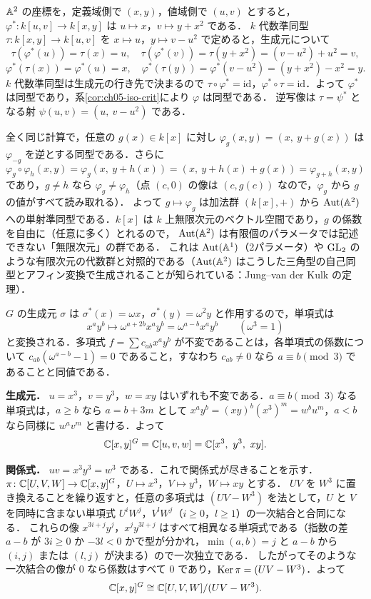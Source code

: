 $\mathbb{A}^2$ の座標を，定義域側で $(x,y)$，値域側で $(u,v)$ とすると，$\varphi^*\colon k[u,v]\to k[x,y]$ は $u\mapsto x$，$v\mapsto y+x^2$ である．
$k$ 代数準同型 $\tau\colon k[x,y]\to k[u,v]$ を $x\mapsto u$，$y\mapsto v-u^2$ で定めると，生成元について
\[
  \tau(\varphi^*(u))=\tau(x)=u,\quad \tau(\varphi^*(v))=\tau(y+x^2)=(v-u^2)+u^2=v,
\]
\[
  \varphi^*(\tau(x))=\varphi^*(u)=x,\quad \varphi^*(\tau(y))=\varphi^*(v-u^2)=(y+x^2)-x^2=y.
\]
$k$ 代数準同型は生成元の行き先で決まるので $\tau\circ\varphi^*=\mathrm{id}$，$\varphi^*\circ\tau=\mathrm{id}$．よって $\varphi^*$ は同型であり，系\ref{cor:ch05-iso-crit}により $\varphi$ は同型である．
逆写像は $\tau=\psi^*$ となる射 $\psi(u,v)=(u,\ v-u^2)$ である．

全く同じ計算で，任意の $g(x)\in k[x]$ に対し $\varphi_g(x,y)=(x,\ y+g(x))$ は $\varphi_{-g}$ を逆とする同型である．さらに
\[
  \varphi_g\circ\varphi_h(x,y)=\varphi_g(x,\ y+h(x))=(x,\ y+h(x)+g(x))=\varphi_{g+h}(x,y)
\]
であり，$g\ne h$ なら $\varphi_g\ne\varphi_h$（点 $(c,0)$ の像は $(c,g(c))$ なので，$\varphi_g$ から $g$ の値がすべて読み取れる）．
よって $g\mapsto\varphi_g$ は加法群 $(k[x],+)$ から $\operatorname{Aut}(\mathbb{A}^2)$ への単射準同型である．$k[x]$ は $k$ 上無限次元のベクトル空間であり，$g$ の係数を自由に（任意に多く）とれるので，
$\operatorname{Aut}(\mathbb{A}^2)$ は有限個のパラメータでは記述できない「無限次元」の群である．
これは $\operatorname{Aut}(\mathbb{A}^1)$（2パラメータ）や $\operatorname{GL}_2$ のような有限次元の代数群と対照的である（$\operatorname{Aut}(\mathbb{A}^2)$ はこうした三角型の自己同型とアフィン変換で生成されることが知られている：Jung--van der Kulk の定理）．

$G$ の生成元 $\sigma$ は $\sigma^*(x)=\omega x$，$\sigma^*(y)=\omega^2y$ と作用するので，単項式は
\[
  x^ay^b\longmapsto\omega^{a+2b}x^ay^b=\omega^{a-b}x^ay^b\qquad(\omega^3=1)
\]
と変換される．多項式 $f=\sum c_{ab}x^ay^b$ が不変であることは，各単項式の係数について $c_{ab}(\omega^{a-b}-1)=0$ であること，すなわち $c_{ab}\ne0$ なら $a\equiv b\pmod3$ であることと同値である．

\textbf{生成元．}
$u=x^3$，$v=y^3$，$w=xy$ はいずれも不変である．$a\equiv b\pmod 3$ なる単項式は，$a\ge b$ なら $a=b+3m$ として $x^ay^b=(xy)^b(x^3)^m=w^bu^m$，$a<b$ なら同様に $w^av^m$ と書ける．よって
\[
  \C[x,y]^G=\C[u,v,w]=\C[x^3,\ y^3,\ xy].
\]

\textbf{関係式．}
$uv=x^3y^3=w^3$ である．これで関係式が尽きることを示す．$\pi\colon\mathbb{C}[U,V,W]\to\mathbb{C}[x,y]^G$，$U\mapsto x^3$，$V\mapsto y^3$，$W\mapsto xy$ とする．
$UV$ を $W^3$ に置き換えることを繰り返すと，任意の多項式は $(UV-W^3)$ を法として，$U$ と $V$ を同時に含まない単項式 $U^iW^j$，$V^lW^j$（$i\ge0$，$l\ge1$）の一次結合と合同になる．
これらの像 $x^{3i+j}y^j$，$x^jy^{3l+j}$ はすべて相異なる単項式である（指数の差 $a-b$ が $3i\ge0$ か $-3l<0$ かで型が分かれ，$\min(a,b)=j$ と $a-b$ から $(i,j)$ または $(l,j)$ が決まる）ので一次独立である．
したがってそのような一次結合の像が $0$ なら係数はすべて $0$ であり，$\operatorname{Ker}\pi=(UV-W^3)$．よって
\[
  \mathbb{C}[x,y]^G\cong\mathbb{C}[U,V,W]/(UV-W^3).
\]

